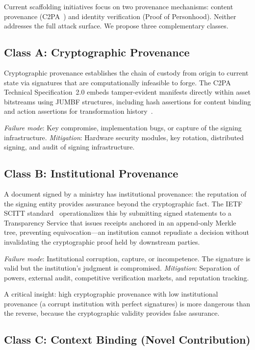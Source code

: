 \documentclass[runningheads]{llncs}
\begin{document}
Current scaffolding initiatives focus on two provenance mechanisms: content provenance (C2PA~\cite{c2pa2024}) and identity verification (Proof of Personhood). Neither addresses the full attack surface. We propose three complementary classes.

\subsection{Class A: Cryptographic Provenance}

Cryptographic provenance establishes the chain of custody from origin to current state via signatures that are computationally infeasible to forge. The C2PA Technical Specification~2.0 embeds tamper-evident manifests directly within asset bitstreams using JUMBF structures, including hash assertions for content binding and action assertions for transformation history~\cite{c2pa2024}.

\emph{Failure mode}: Key compromise, implementation bugs, or capture of the signing infrastructure. \emph{Mitigation}: Hardware security modules, key rotation, distributed signing, and audit of signing infrastructure.

\subsection{Class B: Institutional Provenance}

A document signed by a ministry has institutional provenance: the reputation of the signing entity provides assurance beyond the cryptographic fact. The IETF SCITT standard~\cite{birkholz2025scitt} operationalizes this by submitting signed statements to a Transparency Service that issues receipts anchored in an append-only Merkle tree, preventing equivocation---an institution cannot repudiate a decision without invalidating the cryptographic proof held by downstream parties.

\emph{Failure mode}: Institutional corruption, capture, or incompetence. The signature is valid but the institution's judgment is compromised. \emph{Mitigation}: Separation of powers, external audit, competitive verification markets, and reputation tracking.

A critical insight: high cryptographic provenance with low institutional provenance (a corrupt institution with perfect signatures) is more dangerous than the reverse, because the cryptographic validity provides false assurance.

\subsection{Class C: Context Binding (Novel Contribution)}
\label{sec:contextbinding}
\end{document}
